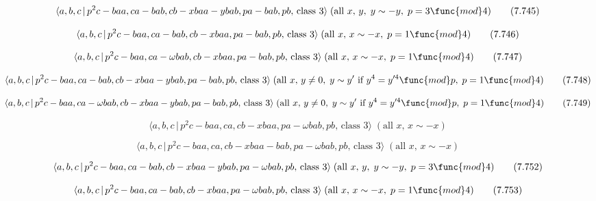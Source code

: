 \documentclass[10pt]{article}
\begin{document}
\begin{equation}
\langle a,b,c\,|\,p^{2}c-baa,ca-bab,cb-xbaa-ybab,pa-bab,pb,\,\text{class }%
3\rangle \;(\text{all }x,\,y,\;y\sim -y,\;p=3\func{mod}4)  \tag{7.745}
\end{equation}

\begin{equation}
\langle a,b,c\,|\,p^{2}c-baa,ca-bab,cb-xbaa,pa-bab,pb,\,\text{class }%
3\rangle \;(\text{all }x,\,x\sim -x,\;p=1\func{mod}4)  \tag{7.746}
\end{equation}

\begin{equation}
\langle a,b,c\,|\,p^{2}c-baa,ca-\omega bab,cb-xbaa,pa-bab,pb,\,\text{class }%
3\rangle \;(\text{all }x,\,x\sim -x,\;p=1\func{mod}4)  \tag{7.747}
\end{equation}

\begin{equation}
\langle a,b,c\,|\,p^{2}c-baa,ca-bab,cb-xbaa-ybab,pa-bab,pb,\,\text{class }%
3\rangle \;(\text{all }x,\,y\neq 0,\;y\sim y^{\prime }\text{ if }%
y^{4}=y^{\prime 4}\func{mod}p,\;p=1\func{mod}4)  \tag{7.748}
\end{equation}

\begin{equation}
\langle a,b,c\,|\,p^{2}c-baa,ca-\omega bab,cb-xbaa-ybab,pa-bab,pb,\,\text{%
class }3\rangle \;(\text{all }x,\,y\neq 0,\;y\sim y^{\prime }\text{ if }%
y^{4}=y^{\prime 4}\func{mod}p,\;p=1\func{mod}4)  \tag{7.749}
\end{equation}

\begin{equation}
\langle a,b,c\,|\,p^{2}c-baa,ca,cb-xbaa,pa-\omega bab,pb,\,\text{class }%
3\rangle \;(\text{all }x,\,x\sim -x)  \tag{7.750}
\end{equation}

\begin{equation}
\langle a,b,c\,|\,p^{2}c-baa,ca,cb-xbaa-bab,pa-\omega bab,pb,\,\text{class }%
3\rangle \;(\text{all }x,\,x\sim -x)  \tag{7.751}
\end{equation}

\begin{equation}
\langle a,b,c\,|\,p^{2}c-baa,ca-bab,cb-xbaa-ybab,pa-\omega bab,pb,\,\text{%
class }3\rangle \;(\text{all }x,\,y,\;y\sim -y,\;p=3\func{mod}4)  \tag{7.752}
\end{equation}

\begin{equation}
\langle a,b,c\,|\,p^{2}c-baa,ca-bab,cb-xbaa,pa-\omega bab,pb,\,\text{class }%
3\rangle \;(\text{all }x,\,x\sim -x,\;p=1\func{mod}4)  \tag{7.753}
\end{equation}
\end{document}
